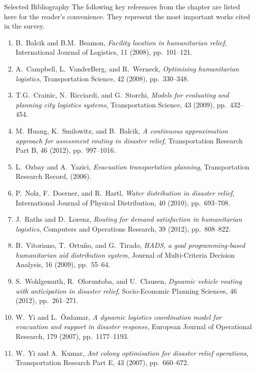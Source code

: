 \documentclass[aspectratio=169,10pt]{beamer}
\begin{document}
\begin{frame}[allowframebreaks]{Selected Bibliography}
  The following key references from the chapter are listed here for
  the reader's convenience.
  They represent the most important works cited in the survey.

  \medskip
  \begin{enumerate}\setlength{\itemsep}{3pt}\footnotesize
    \item B.\ Balcik and B.M.\ Beamon,
          \textit{Facility location in humanitarian relief},
          International Journal of Logistics, 11 (2008), pp.\ 101--121.
    \item A.\ Campbell, L.\ VanderBerg, and R.\ Werneck,
          \textit{Optimising humanitarian logistics},
          Transportation Science, 42 (2008), pp.\ 330--348.
    \item T.G.\ Crainic, N.\ Ricciardi, and G.\ Storchi,
          \textit{Models for evaluating and planning city logistics systems},
          Transportation Science, 43 (2009), pp.\ 432--454.
    \item M.\ Huang, K.\ Smilowitz, and B.\ Balcik,
          \textit{A continuous approximation approach for assessment routing in disaster relief},
          Transportation Research Part B, 46 (2012), pp.\ 997--1016.
    \item L.\ Ozbay and A.\ Yazici,
          \textit{Evacuation transportation planning},
          Transportation Research Record, (2006).
    \item P.\ Nolz, F.\ Doerner, and R.\ Hartl,
          \textit{Water distribution in disaster relief},
          International Journal of Physical Distribution, 40 (2010), pp.\ 693--708.
    \item J.\ Raths and D.\ Lorenz,
          \textit{Routing for demand satisfaction in humanitarian logistics},
          Computers and Operations Research, 39 (2012), pp.\ 808--822.
    \item B.\ Vitoriano, T.\ Ortu\~no, and G.\ Tirado,
          \textit{HADS, a goal programming-based humanitarian aid distribution system},
          Journal of Multi-Criteria Decision Analysis, 16 (2009), pp.\ 55--64.
    \item S.\ Wohlgemuth, R.\ Oloruntoba, and U.\ Clausen,
          \textit{Dynamic vehicle routing with anticipation in disaster relief},
          Socio-Economic Planning Sciences, 46 (2012), pp.\ 261--271.
    \item W.\ Yi and L.\ \"{O}zdamar,
          \textit{A dynamic logistics coordination model for evacuation and support in disaster response},
          European Journal of Operational Research, 179 (2007), pp.\ 1177--1193.
    \item W.\ Yi and A.\ Kumar,
          \textit{Ant colony optimisation for disaster relief operations},
          Transportation Research Part E, 43 (2007), pp.\ 660--672.
  \end{enumerate}
\end{frame}

\end{document}
